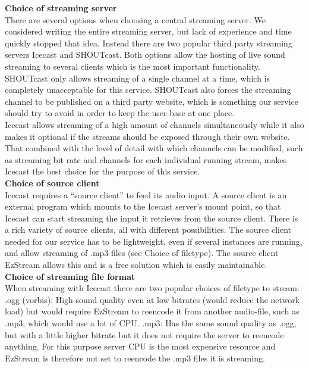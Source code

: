 \documentclass[a4paper,11pt,report]{article}
\begin{document}
\textbf{Choice of streaming server} \\
There are several options when choosing a central streaming server.
We considered writing the entire streaming server, but lack of experience and time quickly stopped that idea. Instead there are two popular third party streaming servers Icecast and SHOUTcast. Both options allow the hosting of live sound streaming to several clients which is the most important functionality. SHOUTcast only allows streaming of a single channel at a time, which is completely unacceptable for this service. SHOUTcast also forces the streaming channel to be published on a third party website, which is something our service should try to avoid in order to keep the user-base at one place. \\
Icecast allows streaming of a high amount of channels simultaneously while it also makes it optional if the streams should be exposed through their own website. That combined with the level of detail with which channels can be modified, such as streaming bit rate and channels for each individual running stream, makes Icecast the best choice for the purpose of this service. \\

\textbf{Choice of source client} \\
Icecast requires a “source client” to feed its audio input. A source client is an external program which mounts to the Icecast server’s mount point, so that Icecast can start streaming the input it retrieves from the source client. There is a rich variety of source clients, all with different possibilities. The source client needed for our service has to be lightweight, even if several instances are running, and allow streaming of .mp3-files (see Choice of filetype). The source client EzStream allows this and is a free solution which is easily maintainable. \\

\textbf{Choice of streaming file format} \\
When streaming with Icecast there are two popular choices of filetype to stream:
.ogg (vorbis): High sound quality even at low bitrates (would reduce the network load) but would require EzStream to reencode it from another audio-file, such as .mp3, which would use a lot of CPU.
.mp3: Has the same sound quality as .ogg, but with a little higher bitrate but it does not require the server to reencode anything.
For this purpose server CPU is the most expensive resource and EzStream is therefore not set to reencode the .mp3 files it is streaming.
\end{document}
